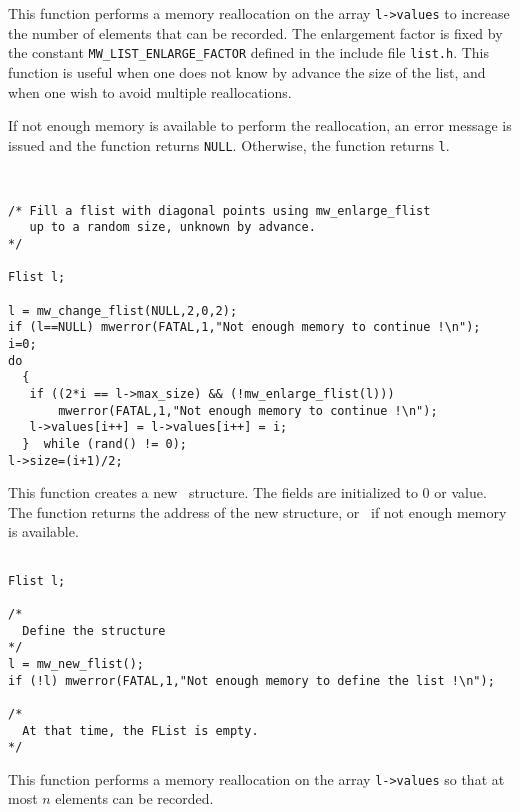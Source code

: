 \newpage %
\Description
This function performs a memory reallocation on the array
\verb+l->values+ to increase the number of elements that can be recorded.
The enlargement factor is fixed by the constant \verb+MW_LIST_ENLARGE_FACTOR+
defined in the include file \verb+list.h+.
This function is useful when one does not know by advance the size of
the list, and when one wish to avoid multiple reallocations.

If not enough memory is available to perform the reallocation, an error
message is issued and the function returns \verb+NULL+.
Otherwise, the function returns \verb+l+.


\Next
\Example
\begin{verbatim}


/* Fill a flist with diagonal points using mw_enlarge_flist 
   up to a random size, unknown by advance.
*/

Flist l; 

l = mw_change_flist(NULL,2,0,2);
if (l==NULL) mwerror(FATAL,1,"Not enough memory to continue !\n");
i=0;
do
  {
   if ((2*i == l->max_size) && (!mw_enlarge_flist(l)))
       mwerror(FATAL,1,"Not enough memory to continue !\n");
   l->values[i++] = l->values[i++] = i;
  }  while (rand() != 0);
l->size=(i+1)/2;
\end{verbatim}

\newpage %


\Description
This function creates a new \flist\ structure. The fields are initialized
to $0$ or \Null value.
The function returns the address of the new structure, or
\Null\ if not enough memory is available.

\Next
\Example
\begin{verbatim}

Flist l;

/*
  Define the structure
*/
l = mw_new_flist();
if (!l) mwerror(FATAL,1,"Not enough memory to define the list !\n");

/* 
  At that time, the FList is empty.
*/
\end{verbatim}

\newpage %


\Description
This function performs a memory reallocation on the array
\verb+l->values+ so that at most $n$ elements can be recorded.

